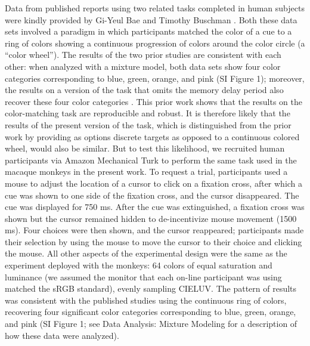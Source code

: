 Data from published reports using two related tasks completed in human subjects were kindly provided by Gi-Yeul Bae \citep{bae_why_2015} and Timothy Buschman \citep{panichello_error-correcting_2019}.
Both these data sets involved a paradigm in which participants matched the color of a cue to a ring of colors showing a continuous progression of colors around the color circle (a ``color wheel''). 
The results of the two prior studies are consistent with each other: when analyzed with a mixture model, both data sets show four color categories corresponding to blue, green, orange, and pink (SI Figure 1); moreover, the results on a version of the task that omits the memory delay period also recover these four color categories \citep{bae_why_2015}.  %
This prior work shows that the results on the color-matching task are reproducible and robust. 
It is therefore likely that the results of the present version of the task, which is distinguished from the prior work by providing as options discrete targets as opposed to a continuous colored wheel, would also be similar. 
But to test this likelihood, we recruited human participants via Amazon Mechanical Turk to perform the same task used in the macaque monkeys in the present work. 
To request a trial, participants used a mouse to adjust the location of a cursor to click on a fixation cross, after which a cue was shown to one side of the fixation cross, and the cursor disappeared. The cue was displayed for 750 ms. 
After the cue was extinguished, a fixation cross was shown but the cursor remained hidden to de-incentivize mouse movement (1500 ms). Four choices were then shown, and the cursor reappeared; participants made their selection by using the mouse to move the cursor to their choice and clicking the mouse. 
All other aspects of the experimental design were the same as the experiment deployed with the monkeys: 64 colors of equal saturation and luminance (we assumed the monitor that each on-line participant was using matched the sRGB standard), evenly sampling CIELUV. 
The pattern of results was consistent with the published studies using the continuous ring of colors, recovering four significant color categories corresponding to blue, green, orange, and pink (SI Figure 1; see Data Analysis: Mixture Modeling for a description of how these data were analyzed). %